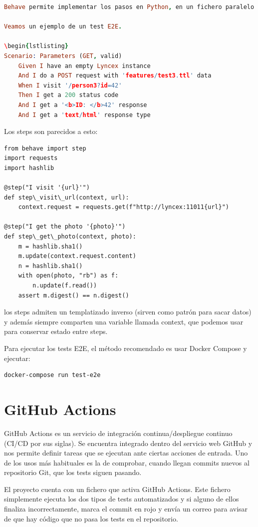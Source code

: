 \documentclass[12pt]{report} %
\begin{document}
\begin{lstlisting}[language=Prolog]
Behave permite implementar los pasos en Python, en un fichero paralelo (carpeta steps).

Veamos un ejemplo de un test E2E.

\begin{lstlisting}
Scenario: Parameters (GET, valid)
    Given I have an empty Lyncex instance
    And I do a POST request with 'features/test3.ttl' data
    When I visit '/person3?id=42'
    Then I get a 200 status code
    And I get a '<b>ID: </b>42' response
    And I get a 'text/html' response type
\end{lstlisting}

Los steps son parecidos a esto:
\begin{lstlisting}
from behave import step
import requests
import hashlib

@step("I visit '{url}'")
def step\_visit\_url(context, url):
    context.request = requests.get(f"http://lyncex:11011{url}")

@step("I get the photo '{photo}'")
def step\_get\_photo(context, photo):
    m = hashlib.sha1()
    m.update(context.request.content)
    n = hashlib.sha1()
    with open(photo, "rb") as f:
        n.update(f.read())
    assert m.digest() == n.digest()
\end{lstlisting}

los steps admiten un templatizado inverso (sirven como patrón para sacar datos) y además siempre comparten una variable llamada context, que podemos usar para conservar estado entre steps.

Para ejecutar los tests E2E, el método recomendado es usar Docker Compose y ejecutar:

\begin{verbatim}
docker-compose run test-e2e
\end{verbatim}

\section{GitHub Actions}

GitHub Actions es un servicio de integración continua/despliegue continuo (CI/CD por sus siglas). Se encuentra integrado dentro del servicio web GitHub y nos permite definir tareas que se ejecutan ante ciertas acciones de entrada. Uno de los usos más habituales es la de comprobar, cuando llegan commits nuevos al repositorio Git, que los tests siguen pasando.

El proyecto cuenta con un fichero que activa GitHub Actions. Este fichero simplemente ejecuta los dos tipos de tests automatizados y si alguno de ellos finaliza incorrectamente, marca el commit en rojo y envía un correo para avisar de que hay código que no pasa los tests en el repositorio.
\end{document}
